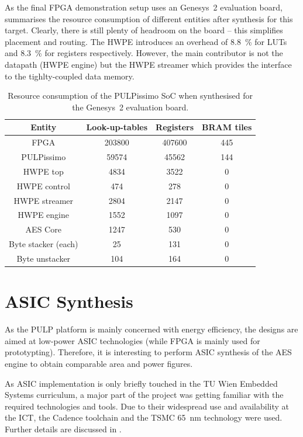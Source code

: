 \documentclass[a4paper, 12pt]{article}
\begin{document}
As the final FPGA demonstration setup uses an Genesys~2 evaluation board,  summarises the resource consumption of different entities after synthesis for this target. Clearly, there is still plenty of headroom on the board -- this simplifies placement and routing. The HWPE introduces an overhead of \SI{8.8}{\percent} for LUTs and \SI{8.3}{\percent} for registers respectively. However, the main contributor is not the datapath (HWPE engine) but the HWPE streamer which provides the interface to the tighlty-coupled data memory.

\begin{table}[h]
    \centering
    \begin{tabular}{c|c c c}
        \toprule
        Entity &  Look-up-tables & Registers & BRAM tiles \\
        \midrule
		FPGA &  203800 &  407600 &  445 \\
		PULPissimo &  59574 &  45562 &  144 \\
		HWPE top &  4834 &  3522 &  0 \\
		HWPE control &  474 &  278 &  0 \\
		HWPE streamer &  2804 &  2147 &  0 \\
		HWPE engine &  1552 &  1097 &  0 \\
		AES Core &  1247 &  530 &  0 \\
		Byte stacker (each) &  25 &  131 &  0 \\
		Byte unstacker &  104 &  164 &  0 \\
        \bottomrule
    \end{tabular}
	\label{tab:results-genesys}
	\caption{Resource consumption of the PULPissimo SoC when synthesised for the Genesys~2 evaluation board.}
\end{table}

\section{ASIC Synthesis} \label{sec:asic}

As the PULP platform is mainly concerned with energy efficiency, the designs are aimed at low-power ASIC technologies (while FPGA is mainly used for prototypting). Therefore, it is interesting to perform ASIC synthesis of the AES engine to obtain comparable area and power figures.

As ASIC implementation is only briefly touched in the TU Wien Embedded Systems curriculum, a major part of the project was getting familiar with the required technologies and tools. Due to their widespread use and availability at the ICT, the Cadence toolchain and the TSMC \SI{65}{nm} technology were used. Further details are discussed in .
\end{document}
